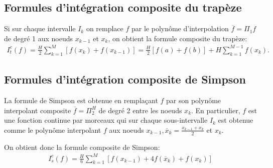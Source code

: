 \subsection{Formules d'intégration composite du trapèze}

Si sur chaque intervalle $I_k$ on remplace $f$ par le polynôme d’interpolation 
$\overline f = \Pi_1 f$ de degré 1 aux noeuds $x_{k-1}$ et $x_k$, on obtient la formule composite du 
trapèze: 
\begin{eqnarray}
	I_t^c(f)=\frac{H}{2}\sum_{k=1}^{M}\left[f(x_k)+f(x_{k-1})\right]=\frac{H}{2}[f(a)+f(b)]+H\sum_{k=1}^{M-1}f(x_k).
\end{eqnarray}

\subsection{Formules d'intégration composite de Simpson}

La formule de Simpson est obtenue en remplaçant $f$ par son polynôme 
interpolant composite $\overline f = \Pi_2^H$ de degré 2 entre les noeuds $x_k$. 
En particulier, $f$ est une fonction continue par morceaux qui sur chaque sous-intervalle $I_k$ est obtenue comme le polynôme interpolant $f$ aux noeuds $x_{k-1}, \overline x_k=\frac{x_{k-1}+x_k}{2}$ et $x_k$.

On obtient donc la formule composite de Simpson: 
\begin{eqnarray}
	I_s^c(f)=\frac{H}{6}\sum_{k=1}^M\left[f(x_{k-1})+4f(\overline x_k)+f(x_k)\right]
\end{eqnarray}
